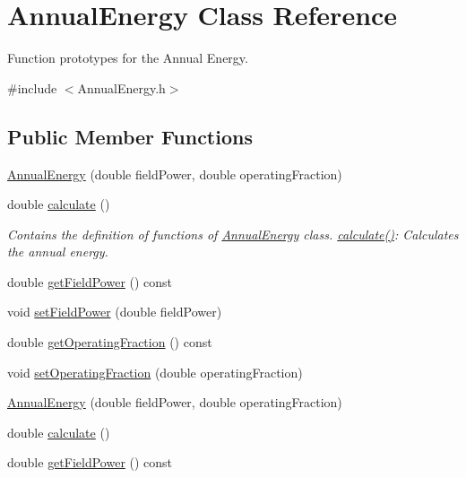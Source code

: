 \hypertarget{class_annual_energy}{}\section{Annual\+Energy Class Reference}
\label{class_annual_energy}


Function prototypes for the Annual Energy.  




{\ttfamily \#include $<$Annual\+Energy.\+h$>$}

\subsection*{Public Member Functions}
\begin{DoxyCompactItemize}
\item 
\hyperlink{class_annual_energy_a5e446ce85879bafeac8fc992cb5b9ed7}{Annual\+Energy} (double field\+Power, double operating\+Fraction)
\item 
double \hyperlink{class_annual_energy_ab599860ffb32ce20a1042a3e9d2ad57f}{calculate} ()
\begin{DoxyCompactList}\small\item\em Contains the definition of functions of \hyperlink{class_annual_energy}{Annual\+Energy} class. \hyperlink{class_annual_energy_ab599860ffb32ce20a1042a3e9d2ad57f}{calculate()}\+: Calculates the annual energy. \end{DoxyCompactList}\item 
double \hyperlink{class_annual_energy_a52aa52274243f578ea7f92d27707cacb}{get\+Field\+Power} () const
\item 
void \hyperlink{class_annual_energy_a4f7212fcf2f6fcd2b12f36ca26a368a1}{set\+Field\+Power} (double field\+Power)
\item 
double \hyperlink{class_annual_energy_a51c2bd68a5268ec9bafe3c70b3a7a6ad}{get\+Operating\+Fraction} () const
\item 
void \hyperlink{class_annual_energy_a5c127c7d5e2a5e4f50559f8b546e8998}{set\+Operating\+Fraction} (double operating\+Fraction)
\item 
\hyperlink{class_annual_energy_a5e446ce85879bafeac8fc992cb5b9ed7}{Annual\+Energy} (double field\+Power, double operating\+Fraction)
\item 
double \hyperlink{class_annual_energy_ab599860ffb32ce20a1042a3e9d2ad57f}{calculate} ()
\item 
double \hyperlink{class_annual_energy_a52aa52274243f578ea7f92d27707cacb}{get\+Field\+Power} () const

\end{DoxyCompactItemize}
